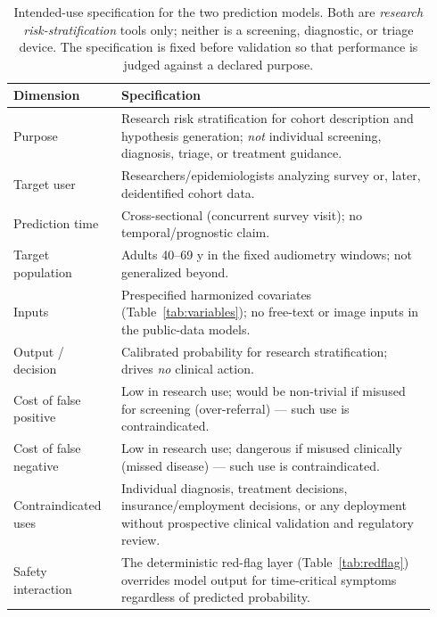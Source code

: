 \begin{table}[htbp]
\centering
\caption{Intended-use specification for the two prediction models. Both are \emph{research risk-stratification} tools only; neither is a screening, diagnostic, or triage device. The specification is fixed before validation so that performance is judged against a declared purpose.}
\label{tab:intended}
\small
\begin{tabular}{p{0.24\linewidth}p{0.70\linewidth}}
\toprule
Dimension & Specification \\
\midrule
Purpose & Research risk stratification for cohort description and hypothesis generation; \emph{not} individual screening, diagnosis, triage, or treatment guidance. \\
Target user & Researchers/epidemiologists analyzing survey or, later, deidentified cohort data. \\
Prediction time & Cross-sectional (concurrent survey visit); no temporal/prognostic claim. \\
Target population & Adults 40--69 y in the fixed audiometry windows; not generalized beyond. \\
Inputs & Prespecified harmonized covariates (Table~\ref{tab:variables}); no free-text or image inputs in the public-data models. \\
Output / decision & Calibrated probability for research stratification; drives \emph{no} clinical action. \\
Cost of false positive & Low in research use; would be non-trivial if misused for screening (over-referral) --- such use is contraindicated. \\
Cost of false negative & Low in research use; dangerous if misused clinically (missed disease) --- such use is contraindicated. \\
Contraindicated uses & Individual diagnosis, treatment decisions, insurance/employment decisions, or any deployment without prospective clinical validation and regulatory review. \\
Safety interaction & The deterministic red-flag layer (Table~\ref{tab:redflag}) overrides model output for time-critical symptoms regardless of predicted probability. \\
\bottomrule
\end{tabular}
\end{table}
